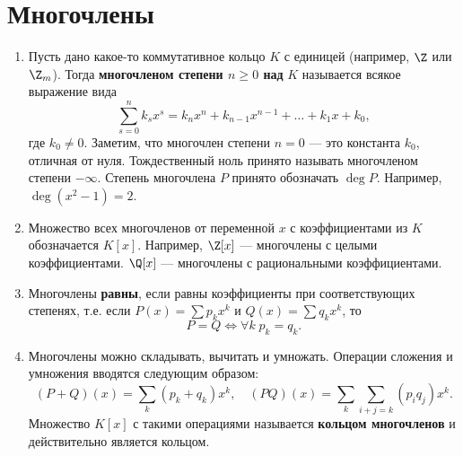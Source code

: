 \section{Многочлены}




\begin{enumerate}
\item Пусть дано какое-то коммутативное кольцо $K$ с единицей (например, $\Z$ или $\Z_m$). Тогда \textbf{многочленом степени $n\ge 0$ над} $K$ называется всякое выражение вида
$$
\sum_{s=0}^n k_sx^s = k_nx^n+k_{n-1}x^{n-1}+\dots+k_1x+k_0,
$$
где $k_0\ne 0$. Заметим, что многочлен степени $n=0$ --- это константа $k_0$, отличная от нуля. Тождественный ноль принято называть многочленом степени $-\infty$. Степень многочлена $P$ принято обозначать $\deg P$. Например, $\deg(x^2-1)=2$.
\item Множество всех многочленов от переменной $x$ с коэффициентами из $K$ обозначается $K[x]$.
Например, $\Z[x]$ --- многочлены с целыми коэффициентами. $\Q[x]$ --- многочлены с рациональными коэффициентами.
\item Многочлены \textbf{равны}, если равны коэффициенты при соответствующих степенях, т.е. если $P(x)=\sum p_kx^k$ и $Q(x)=\sum q_kx^k$,
то
$$
P=Q\Leftrightarrow \forall k \; p_k=q_k.
$$
\item Многочлены можно складывать, вычитать и умножать. Операции сложения и умножения вводятся следующим образом:
$$
(P+Q)(x) = \sum_k(p_k+q_k)x^k,\quad (PQ)(x) = \sum_k\sum_{i+j=k}(p_iq_j)x^k.
$$
Множество $K[x]$ с такими операциями называется \textbf{кольцом многочленов} и действительно является кольцом.


\end{enumerate}
